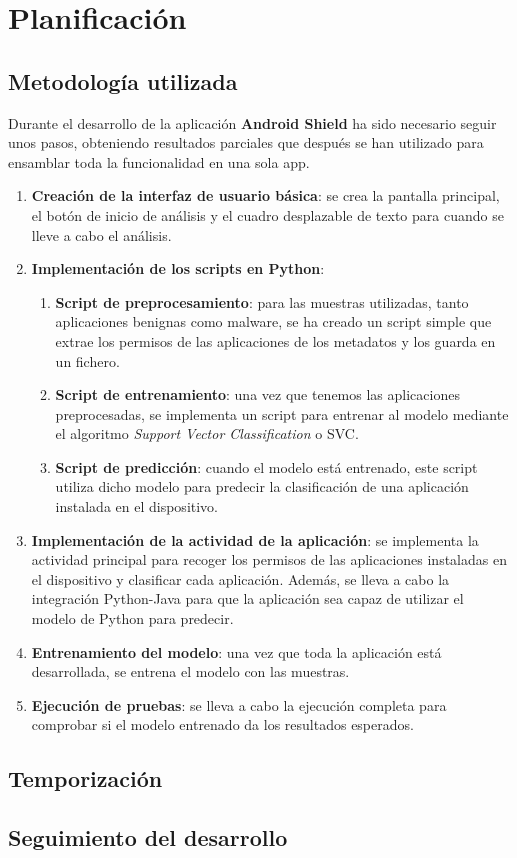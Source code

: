 \chapter{Planificación}

\section{Metodología utilizada}

Durante el desarrollo de la aplicación \textbf{Android Shield} ha sido necesario seguir unos pasos, obteniendo resultados parciales que después se han utilizado para ensamblar toda la funcionalidad en una sola app.

\begin{enumerate}
	\item \textbf{Creación de la interfaz de usuario básica}: se crea la pantalla principal, el botón de inicio de análisis y el cuadro desplazable de texto para cuando se lleve a cabo el análisis.
	\item \textbf{Implementación de los scripts en Python}:
		\begin{enumerate}
			\item \textbf{Script de preprocesamiento}: para las muestras utilizadas, tanto aplicaciones benignas como malware, se ha creado un script simple que extrae los permisos de las aplicaciones de los metadatos y los guarda en un fichero.
			\item \textbf{Script de entrenamiento}: una vez que tenemos las aplicaciones preprocesadas, se implementa un script para entrenar al modelo mediante el algoritmo \textit{Support Vector Classification} o SVC.
			\item \textbf{Script de predicción}: cuando el modelo está entrenado, este script utiliza dicho modelo para predecir la clasificación de una aplicación instalada en el dispositivo. 
		\end{enumerate}
	\item \textbf{Implementación de la actividad de la aplicación}: se implementa la actividad principal para recoger los permisos de las aplicaciones instaladas en el dispositivo y clasificar cada aplicación. Además, se lleva a cabo la integración Python-Java para que la aplicación sea capaz de utilizar el modelo de Python para predecir.
	\item \textbf{Entrenamiento del modelo}: una vez que toda la aplicación está desarrollada, se entrena el modelo con las muestras.
	\item \textbf{Ejecución de pruebas}: se lleva a cabo la ejecución completa para comprobar si el modelo entrenado da los resultados esperados.
\end{enumerate}

\section{Temporización}

\section{Seguimiento del desarrollo}
